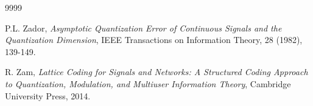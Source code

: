 \documentclass[12pt, reqno]{amsart}
\theoremstyle{plain}
\theoremstyle{definition}
\begin{document}
\begin{thebibliography}{9999}

 P.L. Zador, \emph{Asymptotic Quantization Error of Continuous Signals and the Quantization Dimension}, IEEE Transactions on Information Theory, 28 (1982), 139-149.

 R. Zam, \emph{Lattice Coding for Signals and Networks: A Structured Coding Approach to Quantization, Modulation, and Multiuser Information Theory}, Cambridge University Press, 2014.

\end{thebibliography}
 
\end{document}
